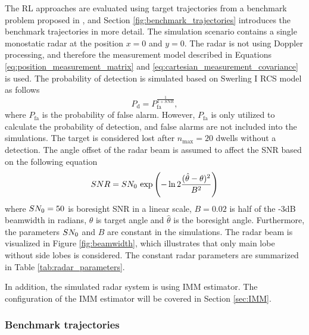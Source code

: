 \documentclass[english, 12pt, a4paper, elec, utf8, a-1b, online]{aaltothesis}
\renewcommand{\exp}[1]{\text{exp}\left( #1 \right)}
\newcommand{\nmax}{n_\text{max}}
\begin{document}
The RL approaches are evaluated using target trajectories from a benchmark problem proposed in \cite{Blair1998}, and Section \ref{fig:benchmark_trajectories} introduces the benchmark trajectories in more detail. 
The simulation scenario contains a single monostatic radar at the position $x=0$ and $y=0$. 
The radar is not using Doppler processing, and therefore the measurement model described in Equations \eqref{eq:position_measurement_matrix} and \eqref{eq:cartesian_measurement_covariance} is used.
The probability of detection is simulated based on Swerling I RCS model as follows
\begin{equation}\label{eq:singer_1_pd}
    P_\text{d} = P_\text{fa}^{\frac{1}{1+SNR}},
\end{equation}
where $P_\text{fa}$ is the probability of false alarm.
However, $P_\text{fa}$ is only utilized to calculate the probability of detection, and false alarms are not included into the simulations.
The target is considered lost after $\nmax=20$ dwells without a detection.
The angle offset of the radar beam is assumed to affect the SNR based on the following equation
\begin{equation} \label{eq:offset_snr}
    SNR = \sno~\exp{ - \ln{2}
        \frac
            {(\hat{\theta} - \theta)^2}
            {B^2}}    
\end{equation}
where $SN_0=50$ is boresight SNR in a linear scale, $B=0.02$ is half of the -3dB beamwidth in radians, $\theta$ is target angle and $\hat{\theta} $ is the boresight angle. 
Furthermore, the parameters $SN_0$ and $B$ are constant in the simulations. 
The radar beam is visualized in Figure \ref{fig:beamwidth}, which illustrates that only main lobe without side lobes is considered. 
The constant radar parameters are summarized in Table \ref{tab:radar_parameters}.


In addition, the simulated radar system is using IMM estimator.
The configuration of the IMM estimator will be covered in Section \ref{sec:IMM}.

\subsubsection{Benchmark trajectories} \label{sec:benchmark_trajectories}
\end{document}
